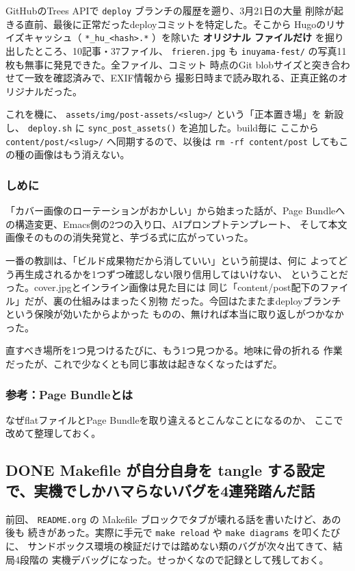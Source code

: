 \documentclass[11pt]{article}
\begin{document}
GitHubのTrees APIで \texttt{deploy} ブランチの履歴を遡り、3月21日の大量
削除が起きる直前、最後に正常だったdeployコミットを特定した。そこから
Hugoのリサイズキャッシュ（ \texttt{*\_hu\_<hash>.*} ）を除いた \textbf{オリジナル
ファイルだけ} を掘り出したところ、10記事・37ファイル、 \texttt{frieren.jpg}
も \texttt{inuyama-fest/} の写真11枚も無事に発見できた。全ファイル、コミット
時点のGit blobサイズと突き合わせて一致を確認済みで、EXIF情報から
撮影日時まで読み取れる、正真正銘のオリジナルだった。

これを機に、 \texttt{assets/img/post-assets/<slug>/} という「正本置き場」を
新設し、 \texttt{deploy.sh} に \texttt{sync\_post\_assets()} を追加した。build毎に
ここから \texttt{content/post/<slug>/} へ同期するので、以後は \texttt{rm -rf
content/post} してもこの種の画像はもう消えない。
\subsubsection{しめに}
\label{sec:orga9d6c28}

「カバー画像のローテーションがおかしい」から始まった話が、Page
Bundleへの構造変更、Emacs側の2つの入り口、AIプロンプトテンプレート、
そして本文画像そのものの消失発覚と、芋づる式に広がっていった。

一番の教訓は、「ビルド成果物だから消していい」という前提は、何に
よってどう再生成されるかを1つずつ確認しない限り信用してはいけない、
ということだった。cover.jpgとインライン画像は見た目には
同じ「content/post配下のファイル」だが、裏の仕組みはまったく別物
だった。今回はたまたまdeployブランチという保険が効いたからよかった
ものの、無ければ本当に取り返しがつかなかった。

直すべき場所を1つ見つけるたびに、もう1つ見つかる。地味に骨の折れる
作業だったが、これで少なくとも同じ事故は起きなくなったはずだ。
\subsubsection{参考：Page Bundleとは}
\label{sec:orgf457b07}

なぜflatファイルとPage Bundleを取り違えるとこんなことになるのか、
ここで改めて整理しておく。
\subsection{{\bfseries\sffamily DONE} Makefile が自分自身を tangle する設定で、実機でしかハマらないバグを4連発踏んだ話}
\label{sec:org723a813}
前回、 \texttt{README.org} の Makefile ブロックでタブが壊れる話を書いたけど、あの後も
続きがあった。実際に手元で \texttt{make reload} や \texttt{make diagrams} を叩くたびに、
サンドボックス環境の検証だけでは踏めない類のバグが次々出てきて、結局4段階の
実機デバッグになった。せっかくなので記録として残しておく。
\end{document}

